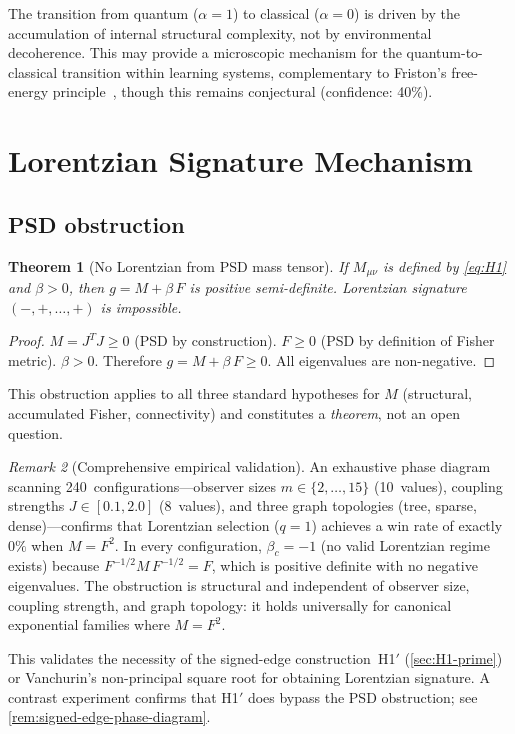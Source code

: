 \documentclass[11pt]{article}
\newtheorem{theorem}{Theorem}[section]
\theoremstyle{definition}
\theoremstyle{remark}
\newtheorem{remark}[theorem]{Remark}
\begin{document}
The transition from quantum ($\alpha = 1$) to classical ($\alpha = 0$)
is driven by the accumulation of internal structural complexity, not by
environmental decoherence.
This may provide a microscopic mechanism for the quantum-to-classical
transition within learning systems, complementary to Friston's
free-energy principle~\cite{Friston2010}, though this remains conjectural
(confidence: 40\%).

\section{Lorentzian Signature Mechanism}
\label{sec:lorentzian}

\subsection{PSD obstruction}
\label{sec:psd-obstruction}

\begin{theorem}[No Lorentzian from PSD mass tensor]
\label{thm:psd-obstruction}
If $M_{\mu\nu}$ is defined by \cref{eq:H1} and $\beta > 0$, then
$g = M + \beta\,F$ is positive semi-definite.
Lorentzian signature $(-,+,\ldots,+)$ is impossible.
\end{theorem}

\begin{proof}
$M = J^T J \geq 0$ (PSD by construction).
$F \geq 0$ (PSD by definition of Fisher metric).
$\beta > 0$.
Therefore $g = M + \beta\,F \geq 0$.
All eigenvalues are non-negative.
\end{proof}

This obstruction applies to all three standard hypotheses for $M$
(structural, accumulated Fisher, connectivity) and constitutes a
\emph{theorem}, not an open question.

\begin{remark}[Comprehensive empirical validation]
\label{rem:psd-phase-diagram}
An exhaustive phase diagram scanning 240~configurations---observer
sizes $m \in \{2, \ldots, 15\}$ (10~values), coupling strengths
$J \in [0.1, 2.0]$ (8~values), and three graph topologies (tree,
sparse, dense)---confirms that Lorentzian selection ($q = 1$)
achieves a win rate of exactly~$0\%$ when $M = F^2$.
In every configuration, $\beta_c = -1$ (no valid Lorentzian regime
exists) because $F^{-1/2} M\, F^{-1/2} = F$, which is positive
definite with no negative eigenvalues.
The obstruction is structural and independent of observer size,
coupling strength, and graph topology: it holds universally for
canonical exponential families where $M = F^2$.

This validates the necessity of the signed-edge construction~H1$'$
(\cref{sec:H1-prime}) or Vanchurin's non-principal square root for
obtaining Lorentzian signature.
A contrast experiment confirms that H1$'$ does bypass the PSD
obstruction; see \cref{rem:signed-edge-phase-diagram}.
\end{remark}
\end{document}
